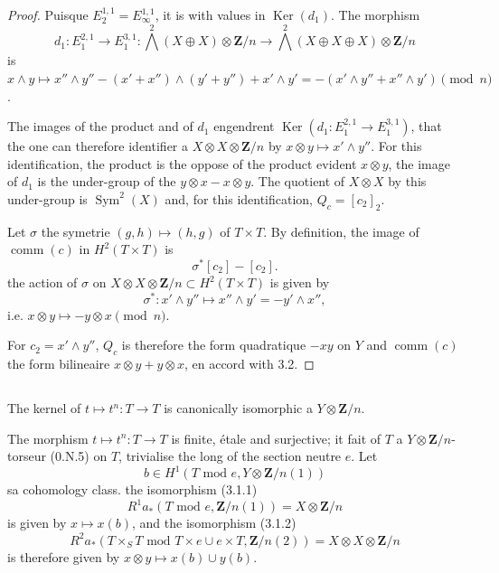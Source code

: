 \documentclass[11pt,a4paper]{article}
\theoremstyle{plain}
\theoremstyle{definition}
\DeclareMathOperator{\Sym}{Sym}
\DeclareMathOperator{\Ker}{Ker}
\DeclareMathOperator{\comm}{comm}
\begin{document}
\begin{proof}
Puisque $E_2^{1,1} = E_\infty^{1,1}$, it is with values in $\Ker(d_1)$. The morphism
\[
d_1 : E_1^{2,1} \to E_1^{3,1} : \bigwedge^2(X \oplus X) \otimes \mathbf{Z}/n \to \bigwedge^2(X \oplus X \oplus X) \otimes \mathbf{Z}/n
\]
is $x \wedge y \mapsto x'' \wedge y'' - (x' + x'') \wedge (y' + y'') + x' \wedge y' = -(x' \wedge y'' + x'' \wedge y') \pmod{n}$.

The images of the product and of $d_1$ engendrent $\Ker(d_1 : E_1^{2,1} \to E_1^{3,1})$, that the one can therefore identifier a $X \otimes X \otimes \mathbf{Z}/n$ by $x \otimes y \mapsto x' \wedge y''$. For this identification, the product is the oppose of the product evident $x \otimes y$, the image of $d_1$ is the under-group of the $y \otimes x - x \otimes y$. The quotient of $X \otimes X$ by this under-group is $\Sym^2(X)$ and, for this identification, $Q_c = [c_2]_2$.

Let $\sigma$ the symetrie $(g, h) \mapsto (h, g)$ of $T \times T$. By definition, the image of $\comm(c)$ in $H^2(T \times T)$ is
\[
\sigma^*[c_2] - [c_2].
\]
the action of $\sigma$ on $X \otimes X \otimes \mathbf{Z}/n \subset H^2(T \times T)$ is given by
\[
\sigma^* : x' \wedge y'' \mapsto x'' \wedge y' = -y' \wedge x'',
\]
i.e. $x \otimes y \mapsto -y \otimes x \pmod{n}$.

For $c_2 = x' \wedge y''$, $Q_c$ is therefore the form quadratique $-xy$ on $Y$ and $\comm(c)$ the form bilineaire $x \otimes y + y \otimes x$, en accord with 3.2.
\end{proof}

\subsection{}\label{3.3}

The kernel of $t \mapsto t^n : T \to T$ is canonically isomorphic a $Y \otimes \mathbf{Z}/n$.

The morphism $t \mapsto t^n : T \to T$ is finite, étale and surjective; it fait of $T$ a $Y \otimes \mathbf{Z}/n$-torseur (0.N.5) on $T$, trivialise the long of the section neutre $e$. Let
\[
b \in H^1(T \text{ mod } e, Y \otimes \mathbf{Z}/n(1))
\]
sa cohomology class. the isomorphism (3.1.1)
\[
R^1 a_*(T \text{ mod } e, \mathbf{Z}/n(1)) = X \otimes \mathbf{Z}/n
\]
is given by $x \mapsto x(b)$, and the isomorphism (3.1.2)
\[
R^2 a_*(T \times_S T \text{ mod } T \times e \cup e \times T, \mathbf{Z}/n(2)) = X \otimes X \otimes \mathbf{Z}/n
\]
is therefore given by $x \otimes y \mapsto x(b) \cup y(b)$.
\end{document}
